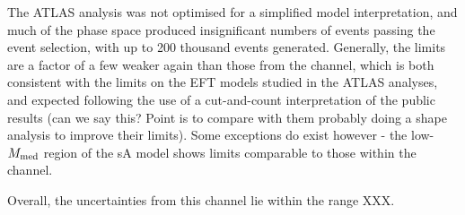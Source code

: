 The ATLAS \monoWZ analysis was not optimised for a simplified model interpretation, and much of the phase space produced insignificant numbers of events passing the event selection, with up to 200 thousand events generated. Generally, the limits are a factor of a few weaker again than those from the \monoZ channel, which is both consistent with the limits on the EFT models studied in the ATLAS analyses, and expected following the use of a cut-and-count interpretation of the \monoWZ public results (can we say this? Point is to compare with them probably doing a shape analysis to improve their limits). Some exceptions do exist however - the low-$M_{\mathrm{med}}$ region of the sA model shows limits comparable to those within the \monoZ channel.

Overall, the uncertainties from this channel lie within the range XXX.

\afterpage{\clearpage}


